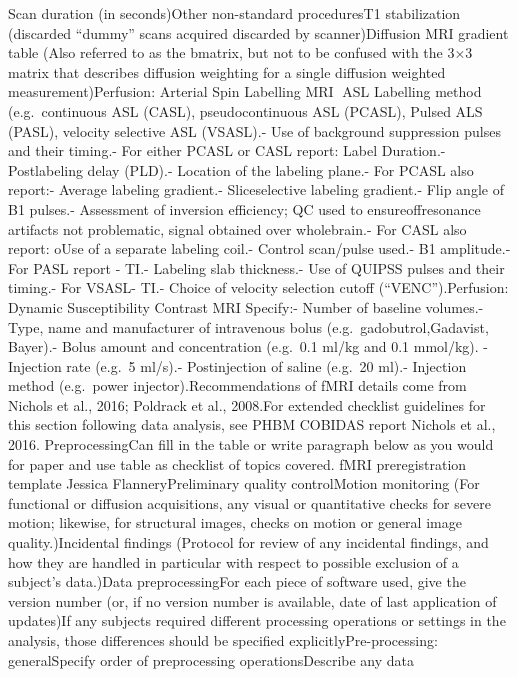 \documentclass[]{article}
\begin{document}
Scan duration (in seconds)Other non-standard proceduresT1 stabilization
(discarded ``dummy'' scans acquired discarded by scanner)Diffusion MRI
gradient table (Also referred to as the bmatrix, but not to be confused
with the 3×3 matrix that describes diffusion weighting for a single
diffusion weighted measurement)Perfusion: Arterial Spin Labelling MRI
ASL Labelling method (e.g.~continuous ASL (CASL), pseudocontinuous ASL
(PCASL), Pulsed ALS (PASL), velocity selective ASL (VSASL).- Use of
background suppression pulses and their timing.- For either PCASL or
CASL report: Label Duration.- Postlabeling delay (PLD).- Location of the
labeling plane.- For PCASL also report:- Average labeling gradient.-
Sliceselective labeling gradient.- Flip angle of B1 pulses.- Assessment
of inversion efficiency; QC used to ensureoffresonance artifacts not
problematic, signal obtained over wholebrain.- For CASL also report:
oUse of a separate labeling coil.- Control scan/pulse used.- B1
amplitude.- For PASL report - TI.- Labeling slab thickness.- Use of
QUIPSS pulses and their timing.- For VSASL- TI.- Choice of velocity
selection cutoff (``VENC'').Perfusion: Dynamic Susceptibility Contrast
MRI Specify:- Number of baseline volumes.- Type, name and manufacturer
of intravenous bolus (e.g.~gadobutrol,Gadavist, Bayer).- Bolus amount
and concentration (e.g.~0.1 ml/kg and 0.1 mmol/kg). - Injection rate
(e.g.~5 ml/s).- Postinjection of saline (e.g.~20 ml).- Injection method
(e.g.~power injector).Recommendations of fMRI details come from Nichols
et al., 2016; Poldrack et al., 2008.For extended checklist guidelines
for this section following data analysis, see PHBM COBIDAS report
Nichols et al., 2016. PreprocessingCan fill in the table or write
paragraph below as you would for paper and use table as checklist of
topics covered. fMRI preregistration template \textbar{} Jessica
FlanneryPreliminary quality controlMotion monitoring (For functional or
diffusion acquisitions, any visual or quantitative checks for severe
motion; likewise, for structural images, checks on motion or general
image quality.)Incidental findings (Protocol for review of any
incidental findings, and how they are handled in particular with respect
to possible exclusion of a subject's data.)Data preprocessingFor each
piece of software used, give the version number (or, if no version
number is available, date of last application of updates)If any subjects
required different processing operations or settings in the analysis,
those differences should be specified explicitlyPre-processing:
generalSpecify order of preprocessing operationsDescribe any data
\end{document}
